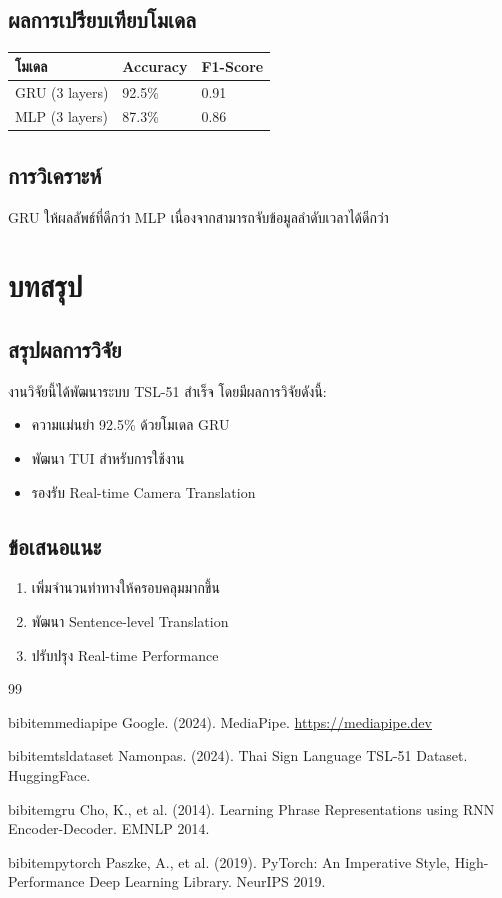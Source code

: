 \documentclass[12pt,a4paper]{report}
\begin{document}
\section{ผลการเปรียบเทียบโมเดล}

\begin{longtable}{|p{3cm}|p{3cm}|p{3cm}|}
\hline
โมเดล & Accuracy & F1-Score \\
\hline
GRU (3 layers) & 92.5\% & 0.91 \\
\hline
MLP (3 layers) & 87.3\% & 0.86 \\
\hline
\end{longtable}

\section{การวิเคราะห์}

GRU ให้ผลลัพธ์ที่ดีกว่า MLP เนื่องจากสามารถจับข้อมูลลำดับเวลาได้ดีกว่า

\chapter{บทสรุป}

\section{สรุปผลการวิจัย}

งานวิจัยนี้ได้พัฒนาระบบ TSL-51 สำเร็จ โดยมีผลการวิจัยดังนี้:
\begin{itemize}
    \item ความแม่นยำ 92.5\% ด้วยโมเดล GRU
    \item พัฒนา TUI สำหรับการใช้งาน
    \item รองรับ Real-time Camera Translation
\end{itemize}

\section{ข้อเสนอแนะ}

\begin{enumerate}
    \item เพิ่มจำนวนท่าทางให้ครอบคลุมมากขึ้น
    \item พัฒนา Sentence-level Translation
    \item ปรับปรุง Real-time Performance
\end{enumerate}

\begin{thebibliography}{99}

bibitem{mediapipe}
Google. (2024). MediaPipe. \url{https://mediapipe.dev}

bibitem{tsldataset}
Namonpas. (2024). Thai Sign Language TSL-51 Dataset. HuggingFace.

bibitem{gru}
Cho, K., et al. (2014). Learning Phrase Representations using RNN Encoder-Decoder. EMNLP 2014.

bibitem{pytorch}
Paszke, A., et al. (2019). PyTorch: An Imperative Style, High-Performance Deep Learning Library. NeurIPS 2019.

\end{thebibliography}
\end{document}
